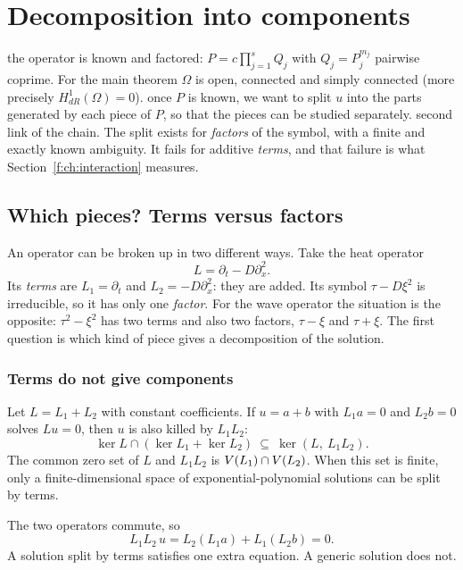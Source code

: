 \section{Decomposition into components}\label{f:ch:decomp}
\sectionbrief
{the operator is known and factored: $P=c\prod_{j=1}^sQ_j$ with $Q_j=P_j^{m_j}$ pairwise coprime. For the main theorem $\Omega$ is open, connected and simply connected (more precisely $H^1_{dR}(\Omega)=0$).}
{once $P$ is known, we want to split $u$ into the parts generated by each piece of $P$, so that the pieces can be studied separately.}
{second link of the chain. The split exists for \emph{factors} of the symbol, with a finite and exactly known ambiguity. It fails for additive \emph{terms}, and that failure is what Section~\ref{f:ch:interaction} measures.}

\subsection{Which pieces? Terms versus factors}

An operator can be broken up in two different ways. Take the heat operator
\[
L=\partial_t-D\partial_x^2 .
\]
Its \emph{terms} are $L_1=\partial_t$ and $L_2=-D\partial_x^2$: they are added. Its symbol $\tau-D\xi^2$ is irreducible, so it has only one \emph{factor}. For the wave operator the situation is the opposite: $\tau^2-\xi^2$ has two terms and also two factors, $\tau-\xi$ and $\tau+\xi$. The first question is which kind of piece gives a decomposition of the solution.

\subsubsection{Terms do not give components}

\begin{proposition}\label{f:prop:terms}
Let $L=L_1+L_2$ with constant coefficients. If $u=a+b$ with $L_1a=0$ and $L_2b=0$ solves $Lu=0$, then $u$ is also killed by $L_1L_2$:
\[
\ker L\cap(\ker L_1+\ker L_2)\ \subseteq\ \ker(L,\ L_1L_2).
\]
The common zero set of $L$ and $L_1L_2$ is $V(L_1)\cap V(L_2)$. When this set is finite, only a finite-dimensional space of exponential-polynomial solutions can be split by terms.

\end{proposition}

\begin{intuition}
The two operators commute, so
\[
L_1L_2\,u=L_2(L_1a)+L_1(L_2b)=0 .
\]
A solution split by terms satisfies one extra equation. A generic solution does not.
\end{intuition}

